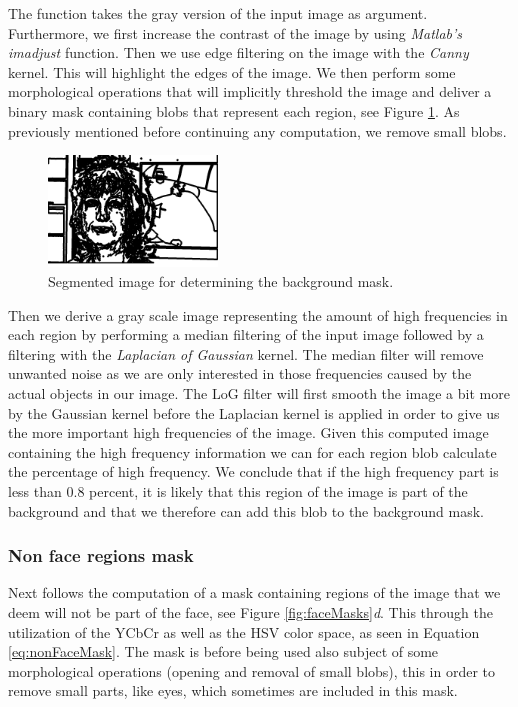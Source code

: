 The function takes the gray version of the input image as argument. Furthermore, we first increase the contrast of the image by using \textit{Matlab's} \textit{imadjust} function. Then we use edge filtering on the image with the \textit{Canny} kernel. This will highlight the edges of the image. We then perform some morphological operations that will implicitly threshold the image and deliver a binary mask containing blobs that represent each region, see Figure \ref{fig:AllBackgroundBlobs}. As previously mentioned before continuing any computation, we remove small blobs.

\begin{figure}[H]
\centering
\includegraphics[width=0.4\textwidth]{img/fd2/AllBackgroundBlobs.png}
\caption{Segmented image for determining the background mask.}
\label{fig:AllBackgroundBlobs}
\end{figure}



Then we derive a gray scale image representing the amount of high frequencies in each region by performing a median filtering of the input image followed by a filtering with the \textit{Laplacian of Gaussian} kernel. The median filter will remove unwanted noise as we are only interested in those frequencies caused by the actual objects in our image. The LoG filter will first smooth the image a bit more by the Gaussian kernel before the Laplacian kernel is applied in order to give us the more important high frequencies of the image. Given this computed image containing the high frequency information we can for each region blob calculate the percentage of high frequency. We conclude that if the high frequency part is less than $0.8$ percent, it is likely that this region of the image is part of the background and that we therefore can add this blob to the background mask.

\subsubsection{Non face regions mask}
Next follows the computation of a mask containing regions of the image that we deem will not be part of the face, see Figure \ref{fig:faceMasks}\textit{d}. This through the utilization of the YCbCr as well as the HSV color space, as seen in Equation \ref{eq:nonFaceMask}. The mask is before being used also subject of some morphological operations (opening and removal of small blobs), this in order to remove small parts, like eyes, which sometimes are included in this mask.


